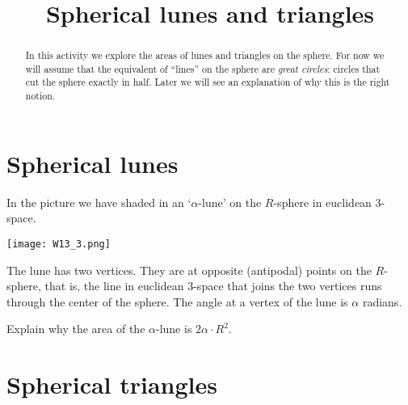 \documentclass[newpage,hints]{ximera}
\title{Spherical lunes and triangles}
\begin{document}
\begin{abstract}
In this activity we explore the areas of lunes and triangles on the sphere.
For now we will assume that the equivalent of ``lines'' on the sphere are
\emph{great circles}: circles that cut the sphere exactly in half.  Later we will
see an explanation of why this is the right notion.
\end{abstract}
\maketitle



\section{Spherical lunes}

In the picture we have shaded in an `$\alpha$-lune' on the $R$-sphere in
euclidean $3$-space.%
\begin{image}
\texttt{[image: W13\_3.png]}%
\end{image}


The lune has two vertices. They are at opposite (antipodal) points on the
$R$-sphere, that is, the line in euclidean $3$-space that joins the two
vertices runs through the center of the sphere. The angle at a vertex of the
lune is $\alpha$ radians.

\begin{problem}
\label{67} Explain why the area of the $\alpha$-lune is $2\alpha
\cdot R^{2}$.
\end{problem}


\section{Spherical triangles}
\end{document}
